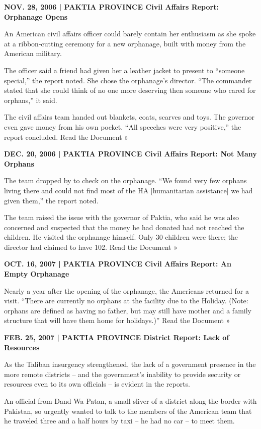 ﻿\documentclass[12pt]{article}
\begin{document}
\textbf{NOV. 28, 2006 | PAKTIA PROVINCE Civil Affairs Report: Orphanage Opens}

An American civil affairs officer could barely contain her enthusiasm as she spoke at a
ribbon-cutting ceremony for a new orphanage, built with money from the American military.

The officer said a friend had given her a leather jacket to present to ``someone special,'' the
report noted. She chose the orphanage's director. ``The commander stated that she could think of no
one more deserving then someone who cared for orphans,'' it said.

The civil affairs team handed out blankets, coats, scarves and toys. The governor even gave money
from his own pocket. ``All speeches were very positive,'' the report concluded. Read the Document »

\textbf{DEC. 20, 2006 | PAKTIA PROVINCE Civil Affairs Report: Not Many Orphans}

The team dropped by to check on the orphanage. ``We found very few orphans living there and could
not find most of the HA $[$humanitarian assistance$]$ we had given them,'' the report noted.

The team raised the issue with the governor of Paktia, who said he was also concerned and suspected
that the money he had donated had not reached the children. He visited the orphanage himself. Only
30 children were there; the director had claimed to have 102. Read the Document »

\textbf{OCT. 16, 2007 | PAKTIA PROVINCE Civil Affairs Report: An Empty Orphanage}

Nearly a year after the opening of the orphanage, the Americans returned for a visit. ``There are
currently no orphans at the facility due to the Holiday. (Note: orphans are defined as having no
father, but may still have mother and a family structure that will have them home for holidays.)''
Read the Document »

\textbf{FEB. 25, 2007 | PAKTIA PROVINCE District Report: Lack of Resources}

As the Taliban insurgency strengthened, the lack of a government presence in the more remote
districts -- and the government's inability to provide security or resources even to its own
officials -- is evident in the reports.

An official from Dand Wa Patan, a small sliver of a district along the border with Pakistan, so
urgently wanted to talk to the members of the American team that he traveled three and a half hours
by taxi -- he had no car -- to meet them.
\end{document}

